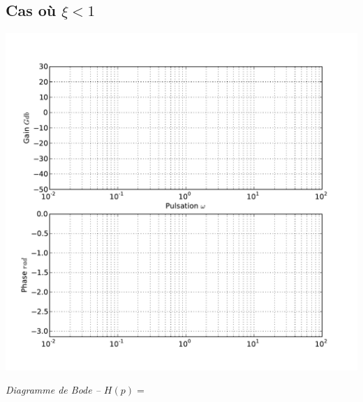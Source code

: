 \documentclass[10pt,oneside]{article}
\begin{document}

\subsection{Cas où $\xi<1$}


\begin{center}
\includegraphics[width=.9\textwidth]{png/bode_vierge}

\textit{Diagramme de Bode -- $H(p)=$}
\end{center}






\end{document}
